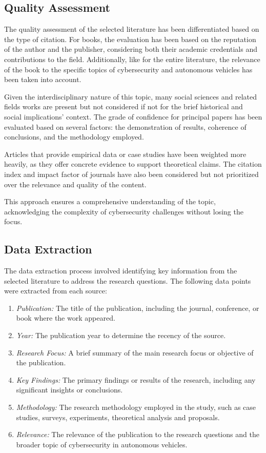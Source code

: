 \subsection{Quality Assessment}\label{subsec:quality-assessment}
The quality assessment of the selected literature has been differentiated based on the type of citation.
For books, the evaluation has been based on the reputation of the author and the publisher, considering both their academic credentials and contributions to the field.
Additionally, like for the entire literature, the relevance of the book to the specific topics of cybersecurity and autonomous vehicles has been taken into account.

Given the interdisciplinary nature of this topic, many social sciences and related fields works are present but not considered if not for the brief historical and social implications' context.
The grade of confidence for principal papers has been evaluated based on several factors:
the demonstration of results, coherence of conclusions, and the methodology employed.

Articles that provide empirical data or case studies have been weighted more heavily, as they offer concrete evidence to support theoretical claims.
The citation index and impact factor of journals have also been considered but not prioritized over the relevance and quality of the content.

This approach ensures a comprehensive understanding of the topic, acknowledging the complexity of cybersecurity challenges without losing the focus.

\subsection{Data Extraction}\label{subsec:data-extraction}

The data extraction process involved identifying key information from the selected literature to address the research questions.
The following data points were extracted from each source:
\begin{enumerate}
    \item \textit{Publication:} The title of the publication, including the journal, conference, or book where the work appeared.
    \item \textit{Year:} The publication year to determine the recency of the source.
    \item \textit{Research Focus:} A brief summary of the main research focus or objective of the publication.
    \item \textit{Key Findings:} The primary findings or results of the research, including any significant insights or conclusions.
    \item \textit{Methodology:} The research methodology employed in the study, such as case studies, surveys, experiments, theoretical analysis and proposals.
    \item \textit{Relevance:} The relevance of the publication to the research questions and the broader topic of cybersecurity in autonomous vehicles.
\end{enumerate}

